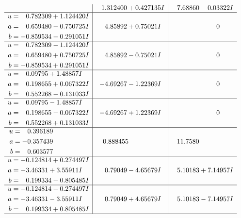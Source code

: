 \documentclass[1p]{elsarticle_modified}
\theoremstyle{definition}
\begin{document}
$$\begin{array}{c|c|c}
 & \phantom{-}1.312400 + 0.427135 I & \phantom{-}7.68860 - 0.03322 I \\ \hline\begin{aligned}
u &= \phantom{-}0.782309 + 1.124420 I \\
a &= \phantom{-}0.659480 - 0.750725 I \\
b &= -0.859534 - 0.291051 I\end{aligned}
 & \phantom{-}4.85892 + 0.75021 I & \phantom{-0.000000 } 0 \\ \hline\begin{aligned}
u &= \phantom{-}0.782309 - 1.124420 I \\
a &= \phantom{-}0.659480 + 0.750725 I \\
b &= -0.859534 + 0.291051 I\end{aligned}
 & \phantom{-}4.85892 - 0.75021 I & \phantom{-0.000000 } 0 \\ \hline\begin{aligned}
u &= \phantom{-}0.09795 + 1.48857 I \\
a &= \phantom{-}0.198655 + 0.067322 I \\
b &= \phantom{-}0.552268 - 0.131033 I\end{aligned}
 & -4.69267 - 1.22369 I & \phantom{-0.000000 } 0 \\ \hline\begin{aligned}
u &= \phantom{-}0.09795 - 1.48857 I \\
a &= \phantom{-}0.198655 - 0.067322 I \\
b &= \phantom{-}0.552268 + 0.131033 I\end{aligned}
 & -4.69267 + 1.22369 I & \phantom{-0.000000 } 0 \\ \hline\begin{aligned}
u &= \phantom{-}0.396189\phantom{ +0.000000I} \\
a &= -0.357439\phantom{ +0.000000I} \\
b &= \phantom{-}0.603577\phantom{ +0.000000I}\end{aligned}
 & \phantom{-}0.888455\phantom{ +0.000000I} & \phantom{-}11.7580\phantom{ +0.000000I} \\ \hline\begin{aligned}
u &= -0.124814 + 0.274497 I \\
a &= -3.46331 + 3.55911 I \\
b &= \phantom{-}0.199334 - 0.805485 I\end{aligned}
 & \phantom{-}0.79049 - 4.65679 I & \phantom{-}5.10183 + 7.14957 I \\ \hline\begin{aligned}
u &= -0.124814 - 0.274497 I \\
a &= -3.46331 - 3.55911 I \\
b &= \phantom{-}0.199334 + 0.805485 I\end{aligned}
 & \phantom{-}0.79049 + 4.65679 I & \phantom{-}5.10183 - 7.14957 I\\
 \hline 
 \end{array}$$\newpage\newpage\renewcommand{\arraystretch}{1}
\end{document}
